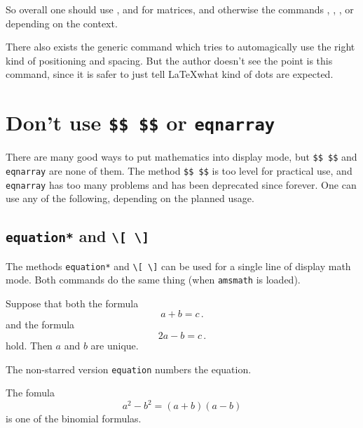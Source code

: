 \documentclass[a4paper, 10pt, abstract=on, headings=standardclasses]{scrartcl}
\begin{document}
So overall one should use ,  and  for matrices, and otherwise the commands , , ,  or  depending on the context.

There also exists the generic command  which tries to automagically use the right kind of positioning and spacing.
But the author doesn’t see the point is this command, since it is safer to just tell \LaTeX what kind of dots are expected.





\section{Don’t use \texttt{\$\$  \$\$} or \texttt{eqnarray}}

There are many good ways to put mathematics into display mode, but \texttt{\$\$  \$\$} and \texttt{eqnarray} are none of them.
The method \texttt{\$\$  \$\$} is too level for practical use, and \texttt{eqnarray} has too many problems and has been deprecated since forever.
One can use any of the following, depending on the planned usage.



\subsection{\texttt{equation*} and \texttt{{\textbackslash}[ {\textbackslash}]}}
The methods \texttt{equation*} and \texttt{{\textbackslash}[ {\textbackslash}]} can be used for a single line of display math mode.
Both commands do the same thing (when \texttt{amsmath} is loaded).
\begin{LTXexample}
  Suppose that both the formula
  \[
    a + b = c \,.
  \]
  and the formula
  \begin{equation*}
    2a - b = c \,.
  \end{equation*}
  hold.
  Then $a$ and $b$ are unique.
\end{LTXexample}
The non-starred version \texttt{equation} numbers the equation.
\begin{LTXexample}
  The fomula
  \begin{equation}
    a^2 - b^2 = (a + b)(a - b)
  \end{equation}
  is one of the binomial formulas.
\end{LTXexample}
\end{document}
